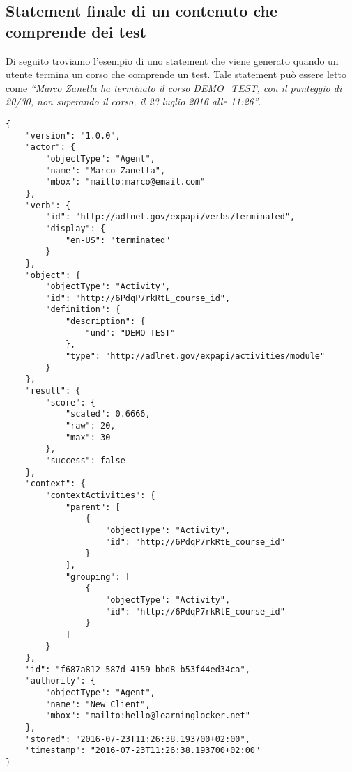     \subsection{Statement finale di un contenuto che comprende dei test}
    Di seguito troviamo l'esempio di uno statement che viene generato quando un utente termina un corso che comprende un test. Tale statement può essere letto come \textit{``Marco Zanella ha terminato il corso DEMO\_TEST, con il punteggio di 20/30, non superando il corso, il 23 luglio 2016 alle 11:26''}.
\begin{lstlisting}
{
    "version": "1.0.0",
    "actor": {
        "objectType": "Agent",
        "name": "Marco Zanella",
        "mbox": "mailto:marco@email.com"
    },
    "verb": {
        "id": "http://adlnet.gov/expapi/verbs/terminated",
        "display": {
            "en-US": "terminated"
        }
    },
    "object": {
        "objectType": "Activity",
        "id": "http://6PdqP7rkRtE_course_id",
        "definition": {
            "description": {
                "und": "DEMO TEST"
            },
            "type": "http://adlnet.gov/expapi/activities/module"
        }
    },
    "result": {
        "score": {
            "scaled": 0.6666,
            "raw": 20,
            "max": 30
        },
        "success": false
    },
    "context": {
        "contextActivities": {
            "parent": [
                {
                    "objectType": "Activity",
                    "id": "http://6PdqP7rkRtE_course_id"
                }
            ],
            "grouping": [
                {
                    "objectType": "Activity",
                    "id": "http://6PdqP7rkRtE_course_id"
                }
            ]
        }
    },
    "id": "f687a812-587d-4159-bbd8-b53f44ed34ca",
    "authority": {
        "objectType": "Agent",
        "name": "New Client",
        "mbox": "mailto:hello@learninglocker.net"
    },
    "stored": "2016-07-23T11:26:38.193700+02:00",
    "timestamp": "2016-07-23T11:26:38.193700+02:00"
}
\end{lstlisting}